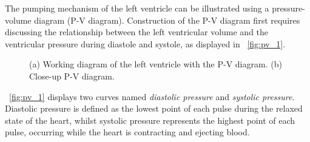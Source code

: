 The pumping mechanism of the left ventricle can be illustrated using a pressure-volume diagram (P-V diagram). Construction of the P-V diagram first requires discussing the relationship between the left ventricular volume and the ventricular pressure during diastole and systole, as displayed in \figurename~\ref{fig:pv_1}.
\begin{figure}[ht]
  \centering
  \caption[P-V diagram \cite{GH20}]{(a) Working diagram of the left ventricle with the P-V diagram. (b) Close-up P-V diagram. \cite{GH20}}
  \label{fig:pv}
\end{figure}
\figurename~\ref{fig:pv_1} displays two curves named \textit{diastolic pressure} and \textit{systolic pressure}. Diastolic pressure is defined as the lowest point of each pulse during the relaxed state of the heart, whilst systolic pressure represents the highest point of each pulse, occurring while the heart is contracting and ejecting blood. \cite{HKS4}
